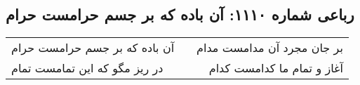 \begin{center}
\section*{رباعی شماره ۱۱۱۰: آن باده که بر جسم حرامست حرام}
\label{sec:1110}
\begin{longtable}{l p{0.5cm} r}
آن باده که بر جسم حرامست حرام
&&
بر جان مجرد آن مدامست مدام
\\
در ریز مگو که این تمامست تمام
&&
آغاز و تمام ما کدامست کدام
\\
\end{longtable}
\end{center}
